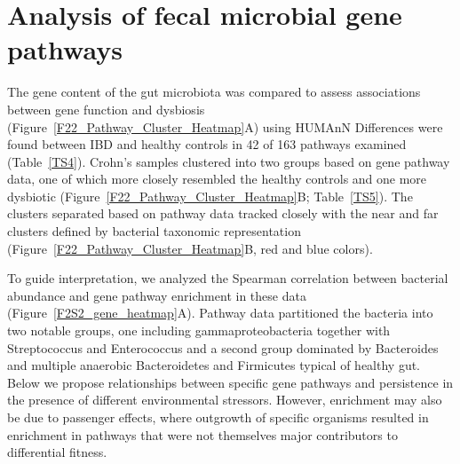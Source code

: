 \section{Analysis of fecal microbial gene pathways}
The gene content of the gut microbiota was compared to assess associations between gene function and dysbiosis (Figure~\ref{F22_Pathway_Cluster_Heatmap}A) using HUMAnN \citep{Abubucker:2012fd} Differences were found between IBD and healthy controls in 42 of 163 pathways examined (Table~\ref{TS4}). Crohn's samples clustered into two groups based on gene pathway data, one of which more closely resembled the healthy controls and one more dysbiotic (Figure~\ref{F22_Pathway_Cluster_Heatmap}B; Table~\ref{TS5}). The clusters separated based on pathway data tracked closely with the near and far clusters defined by bacterial taxonomic representation (Figure~\ref{F22_Pathway_Cluster_Heatmap}B, red and blue colors). 

To guide interpretation, we analyzed the Spearman correlation between bacterial abundance and gene pathway enrichment in these data (Figure~\ref{F2S2_gene_heatmap}A). Pathway data partitioned the bacteria into two notable groups, one including gammaproteobacteria together with Streptococcus and Enterococcus and a second group dominated by Bacteroides and multiple anaerobic Bacteroidetes and Firmicutes typical of healthy gut. Below we propose relationships between specific gene pathways and persistence in the presence of different environmental stressors. However, enrichment may also be due to passenger effects, where outgrowth of specific organisms resulted in enrichment in pathways that were not themselves major contributors to differential fitness. 

